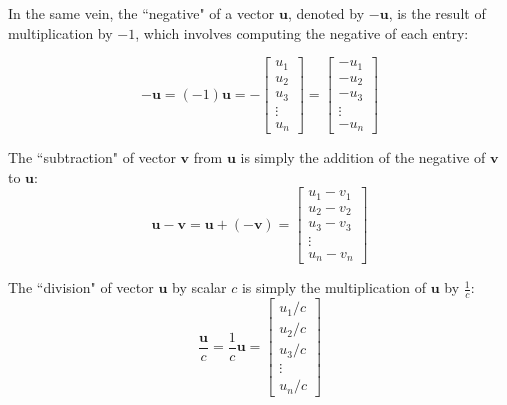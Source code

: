 \documentclass{article}
\begin{document}
In the same vein, the ``negative" of a vector \(\mathbf{u}\), denoted by \(-\mathbf{u}\), is the result of multiplication by \(-1\), which involves computing the negative of each entry:

\[-\mathbf{u} = (-1)\mathbf{u} = -\begin{bmatrix} u_1 \\ u_2 \\ u_3 \\ \vdots \\ u_n \end{bmatrix} = \begin{bmatrix} -u_1  \\ -u_2 \\ -u_3 \\ \vdots \\ -u_n \end{bmatrix}\]

The ``subtraction" of vector \(\mathbf{v}\) from \(\mathbf{u}\) is simply the addition of the negative of \(\mathbf{v}\) to \(\mathbf{u}\):
\[\mathbf{u} - \mathbf{v} = \mathbf{u} + (-\mathbf{v}) = \begin{bmatrix} u_1 - v_1 \\ u_2 - v_2 \\ u_3 - v_3 \\ \vdots \\ u_n - v_n \end{bmatrix}\]

The ``division" of vector \(\mathbf{u}\) by scalar \(c\) is simply the multiplication of \(\mathbf{u}\) by \(\frac{1}{c}\):
\[\frac{\mathbf{u}}{c} = \frac{1}{c}\mathbf{u} = \begin{bmatrix} u_1/c  \\ u_2/c \\ u_3/c \\ \vdots \\ u_n/c \end{bmatrix}\]
\end{document}
